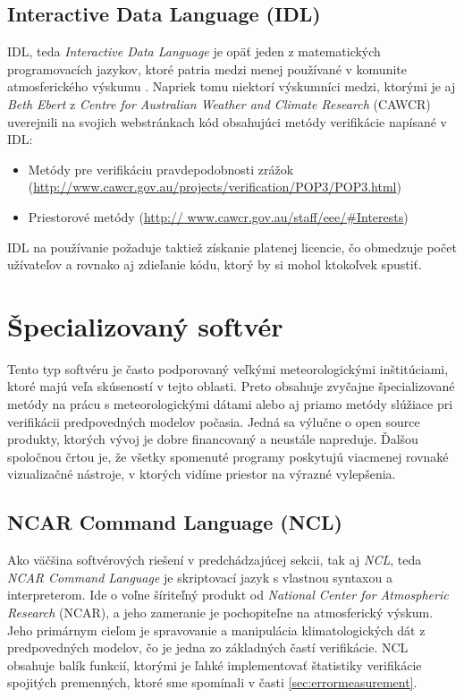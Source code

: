 \subsection[IDL]{Interactive Data Language (IDL)}
IDL, teda \textit{Interactive Data Language} \cite{IDL} je opäť jeden z matematických programovacích jazykov, ktoré patria medzi menej používané v komunite atmosferického výskumu \cite{VerifSoft}. Napriek tomu niektorí výskumníci medzi, ktorými je aj \textit{Beth Ebert} z \textit{Centre for Australian Weather and Climate Research} (CAWCR) uverejnili na svojich webstránkach kód obsahujúci metódy verifikácie napísané v IDL:
\begin{itemize}
	\item Metódy pre verifikáciu pravdepodobnosti zrážok 	(\url{http://www.cawcr.gov.au/projects/verification/POP3/POP3.html})
	\item Priestorové metódy (\url{http://
		www.cawcr.gov.au/staff/eee/#Interests})
\end{itemize} 
IDL na používanie požaduje taktiež získanie platenej licencie, čo obmedzuje počet užívateľov a rovnako aj zdieľanie kódu, ktorý by si mohol ktokoľvek spustiť.


\section{Špecializovaný softvér}

Tento typ softvéru je často podporovaný veľkými meteorologickými inštitúciami, ktoré majú veľa skúseností v tejto oblasti. Preto  obsahuje zvyčajne špecializované metódy na prácu s meteorologickými dátami alebo aj priamo metódy slúžiace pri verifikácii predpovedných modelov počasia. Jedná sa výlučne o open source produkty, ktorých vývoj je dobre financovaný a neustále napreduje. Ďalšou spoločnou črtou je, že všetky spomenuté programy poskytujú viacmenej rovnaké vizualizačné nástroje, v ktorých vidíme priestor na výrazné vylepšenia.

\subsection[NCL]{NCAR Command Language (NCL)}
Ako väčšina softvérových riešení v predchádzajúcej sekcii, tak aj \textit{NCL}, teda \textit{NCAR Command Language} \cite{NCL} je skriptovací jazyk s vlastnou syntaxou a interpreterom. Ide o voľne šíriteľný produkt od \textit{National Center for Atmospheric Research} (NCAR), a jeho zameranie je pochopiteľne na atmosferický výskum. Jeho primárnym cieľom je spravovanie a manipulácia klimatologických dát z predpovedných modelov, čo je jedna zo základných častí verifikácie. NCL obsahuje balík funkcií, ktorými je ľahké implementovať štatistiky verifikácie spojitých premenných, ktoré sme spomínali v časti \ref{sec:errormeasurement}. 

